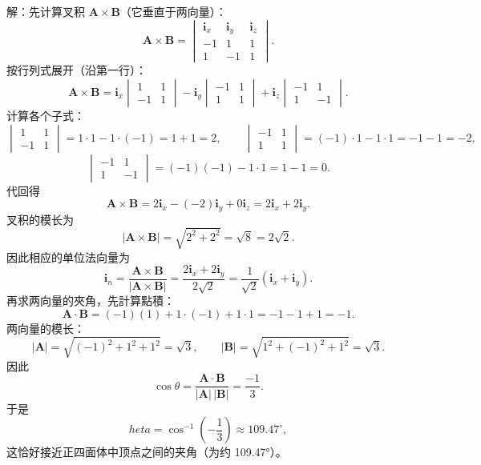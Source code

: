 解：先计算叉积 $\mathbf{A}\times\mathbf{B}$（它垂直于两向量）：
\[
\mathbf{A}\times\mathbf{B}=\begin{vmatrix}\mathbf{i}_x&\mathbf{i}_y&\mathbf{i}_z\\ -1&1&1\\ 1&-1&1\end{vmatrix}.
\]
按行列式展开（沿第一行）：
\[
\mathbf{A}\times\mathbf{B}=\mathbf{i}_x\begin{vmatrix}1&1\\ -1&1\end{vmatrix}-\mathbf{i}_y\begin{vmatrix}-1&1\\ 1&1\end{vmatrix}+\mathbf{i}_z\begin{vmatrix}-1&1\\ 1&-1\end{vmatrix}.
\]
计算各个子式：
\[
\begin{vmatrix}1&1\\ -1&1\end{vmatrix}=1\cdot 1-1\cdot(-1)=1+1=2,\qquad
\begin{vmatrix}-1&1\\ 1&1\end{vmatrix}=(-1)\cdot 1-1\cdot 1=-1-1=-2,
\]
\[
\begin{vmatrix}-1&1\\ 1&-1\end{vmatrix}=(-1)(-1)-1\cdot 1=1-1=0.
\]
代回得
\[
\mathbf{A}\times\mathbf{B}=2\mathbf{i}_x-(-2)\mathbf{i}_y+0\mathbf{i}_z=2\mathbf{i}_x+2\mathbf{i}_y.
\]
叉积的模长为
\[
|\mathbf{A}\times\mathbf{B}|=\sqrt{2^2+2^2}=\sqrt{8}=2\sqrt{2}.
\]
因此相应的单位法向量为
\[
\mathbf{i}_n=\dfrac{\mathbf{A}\times\mathbf{B}}{|\mathbf{A}\times\mathbf{B}|}=\dfrac{2\mathbf{i}_x+2\mathbf{i}_y}{2\sqrt{2}}=\dfrac{1}{\sqrt{2}}(\mathbf{i}_x+\mathbf{i}_y).
\]
再求两向量的夾角，先計算點積：
\[
\mathbf{A}\cdot\mathbf{B}=(-1)(1)+1\cdot(-1)+1\cdot 1=-1-1+1=-1.
\]
两向量的模长：
\[
|\mathbf{A}|=\sqrt{(-1)^2+1^2+1^2}=\sqrt{3},\qquad |\mathbf{B}|=\sqrt{1^2+(-1)^2+1^2}=\sqrt{3}.
\]
因此
\[
\cos\theta=\dfrac{\mathbf{A}\cdot\mathbf{B}}{|\mathbf{A}|\,|\mathbf{B}|}=\dfrac{-1}{3}.
\]
于是
\[
	heta=\cos^{-1}\left(-\dfrac{1}{3}\right)\approx 109.47^{\circ},
\]
这恰好接近正四面体中顶点之间的夹角（为约 109.47°）。


